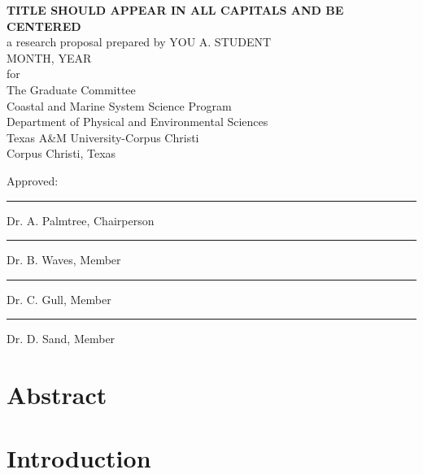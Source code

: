 \documentclass[12pt]{article}
\begin{document}
\begin{titlepage}
    \thispagestyle{empty}
    \centering
    \vspace*{3cm}
    {\large\textbf{TITLE SHOULD APPEAR IN ALL CAPITALS AND BE CENTERED}}\\
    \vfill
    {\large a research proposal prepared by YOU A. STUDENT}\\
    \vspace{0.1in}
    {\large MONTH, YEAR}\\
    \vfill
    for\\
    {\large The Graduate Committee}\\
    {\large Coastal and Marine System Science Program}\\
    {\large Department of Physical and Environmental Sciences}\\
    {\large Texas A\&M University-Corpus Christi}\\
    {\large Corpus Christi, Texas}\\
    \vfill
    \begin{minipage}{0.5\textwidth}
        Approved:
        \vfill
        \rule{0pt}{0.8cm}\hrule
        \vspace{0.1cm}
        Dr. A. Palmtree, Chairperson
        \vfill
        \rule{0pt}{0.5cm}\hrule
        \vspace{0.1cm}
        Dr. B. Waves, Member
        \vfill
        \rule{0pt}{0.5cm}\hrule
        \vspace{0.1cm}
        Dr. C. Gull, Member
        \vfill
        \rule{0pt}{0.5cm}\hrule
        \vspace{0.1cm}
        Dr. D. Sand, Member
    \end{minipage}
    \vfill
\end{titlepage}

\setcounter{page}{3}
\section*{Abstract}
\lipsum[1] %
\newpage

\newpage
\section{Introduction}
\lipsum[1-2] %

\newpage
\end{document}
